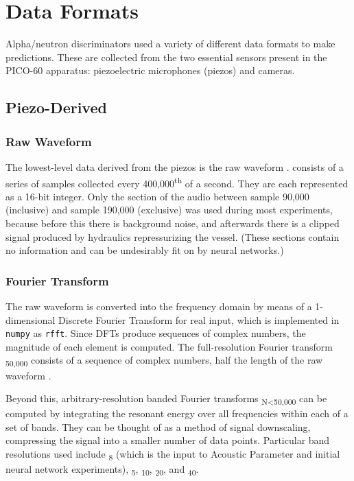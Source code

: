 \documentclass[12pt]{article}
\begin{document}
\section{Data Formats}

Alpha/neutron discriminators used a variety of different data formats to make predictions. These are collected from the two essential sensors present in the PICO-60 apparatus: piezoelectric microphones (piezos) and cameras.

\subsection{Piezo-Derived}

\subsubsection{Raw Waveform}

The lowest-level data derived from the piezos is the raw waveform \textomega. \textomega{} consists of a series of samples collected every 400,000\textsuperscript{th} of a second. They are each represented as a 16-bit integer. Only the section of the audio between sample 90,000 (inclusive) and sample 190,000 (exclusive) was used during most experiments, because before this there is background noise, and afterwards there is a clipped signal produced by hydraulics repressurizing the vessel. (These sections contain no information and can be undesirably fit on by neural networks.)

\subsubsection{Fourier Transform}

The raw waveform \textomega{} is converted into the frequency domain by means of a 1-dimensional Discrete Fourier Transform for real input, which is implemented in \texttt{numpy} as \texttt{rfft}. Since DFTs produce sequences of complex numbers, the magnitude of each element is computed. The full-resolution Fourier transform \textbeta \textsubscript{50,000} consists of a sequence of complex numbers, half the length of the raw waveform \textomega.

Beyond this, arbitrary-resolution banded Fourier transforms \textbeta \textsubscript{N\textless50,000} can be computed by integrating the resonant energy over all frequencies within each of a set of bands. They can be thought of as a method of signal downscaling, compressing the signal into a smaller number of data points. Particular band resolutions used include \textbeta \textsubscript{8} (which is the input to Acoustic Parameter and initial neural network experiments), \textbeta \textsubscript{5}, \textbeta \textsubscript{10}, \textbeta \textsubscript{20}, and \textbeta \textsubscript{40}.
\end{document}
